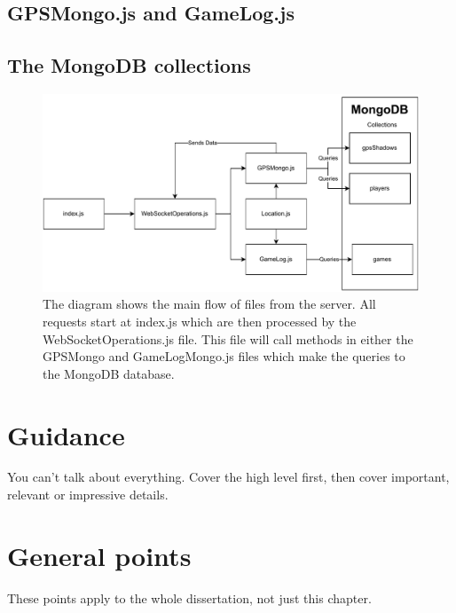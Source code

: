 \documentclass{l4proj}
\begin{document}
\subsection{GPSMongo.js and GameLog.js}

\subsection{The MongoDB collections}


\begin{figure}
    \centering
    \includegraphics[width=\linewidth]{images/serverSideOverview.pdf}    

    \caption{
        The diagram shows the main flow of files from the server. All requests start at index.js which are
        then processed by the WebSocketOperations.js file. This file will call methods in either the GPSMongo
        and GameLogMongo.js files which make the queries to the MongoDB database.  
    }

    \label{fig:serverSideOverview} 
\end{figure}



\section{Guidance}
You can't talk about everything. Cover the high level first, then cover important, relevant or impressive details.



\section{General points}

These points apply to the whole dissertation, not just this chapter.
\end{document}
